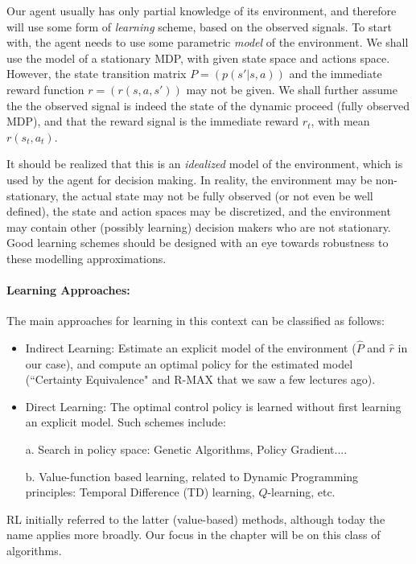 Our agent usually has only partial knowledge of its environment, and therefore
will use some form of {\em learning} scheme, based on the observed signals.
To start with, the agent needs to use some parametric {\em model} of the environment.
We shall use the model of a stationary MDP, with given state space and actions space.
However, the state transition matrix $P=(p(s'|s,a))$ and the immediate reward function
$r=(r(s,a,s'))$ may not be given.
We shall further assume the the observed signal is indeed the state of the
dynamic proceed (fully observed MDP), and that the reward signal is the immediate
reward $r_t$, with mean $r(s_t,a_t)$.

It should be realized that this is an {\em idealized} model of the environment,
which is used by the agent for decision making. In reality, the environment
may be non-stationary, the actual state may not be fully observed (or not even be
well defined), the state and action spaces may be discretized, and the environment
may contain other (possibly learning) decision makers who are not stationary.
Good learning schemes should be designed with an eye towards robustness to these modelling
approximations.


\paragraph{Learning Approaches:} The main approaches for learning in this context can
be classified as follows:
\begin{itemize}
\item Indirect Learning: Estimate an explicit model of the environment
($\hat{P}$ and $\hat{r}$ in our case),
and compute an optimal policy for the estimated model (``Certainty Equivalence" and R-MAX that we saw a few lectures ago).
\item Direct Learning: The optimal control policy is learned without first learning
an explicit model. Such schemes include:

a. Search in policy space: Genetic Algorithms, Policy Gradient....

b.  Value-function based learning, related to Dynamic Programming principles:
 Temporal Difference (TD) learning, $Q$-learning, etc.
\end{itemize}
RL initially referred to the latter (value-based) methods, although
today the name applies more broadly. Our focus in the chapter will be
on this class of algorithms.


